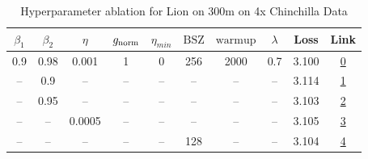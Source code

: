\begin{table}[H]
\centering
\caption{Hyperparameter ablation for Lion on 300m on 4x Chinchilla Data}
\label{tab:ablation_lion_300m_on_4x_chinchilla_data}
\begin{tabular}{cccccccccc}
\toprule
$\beta_1$ & $\beta_2$ & $\eta$ & $g_{\mathrm{norm}}$ & $\eta_{min}$ & $\mathrm{BSZ}$ & $\mathrm{warmup}$ & $\lambda$ & Loss & Link \\
\midrule
0.9 & 0.98 & 0.001 & 1 & 0 & 256 & 2000 & 0.7 & 3.100 & \href{https://wandb.ai/marin-community/optimizer-scaling/runs/sweep-300m-24B-lion5aad2alr0.001-wd0.7-minlr0-warmup2000-b10.9-b-edb7fa}{0} \\
\midrule
-- & 0.9 & -- & -- & -- & -- & -- & -- & 3.114 & \href{https://wandb.ai/marin-community/optimizer-scaling/runs/sweep-300m-24B-lionb554b6lr0.001-wd0.7-minlr0-warmup2000-b10.9-b-4d69db}{1} \\
-- & 0.95 & -- & -- & -- & -- & -- & -- & 3.103 & \href{https://wandb.ai/marin-community/optimizer-scaling/runs/sweep-300m-24B-lion1d519dlr0.001-wd0.7-minlr0-warmup2000-b10.9-b-a24dd3}{2} \\
-- & -- & 0.0005 & -- & -- & -- & -- & -- & 3.105 & \href{https://wandb.ai/marin-community/optimizer-scaling/runs/sweep-300m-24B-liond0e427lr0.0005-wd0.7-minlr0-warmup2000-b10.9--ab64aa}{3} \\
-- & -- & -- & -- & -- & 128 & -- & -- & 3.104 & \href{https://wandb.ai/marin-community/optimizer-scaling/runs/sweep-300m-24B-lioneb1a25lr0.001-wd0.7-minlr0-warmup2000-b10.9-b-8b79ae}{4} \\
\bottomrule
\end{tabular}
\end{table}

